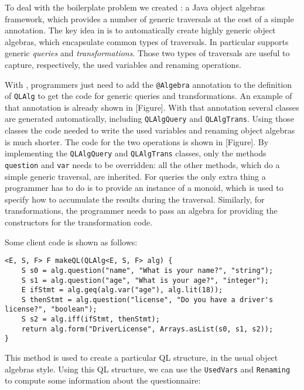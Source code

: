 To deal with the boilerplate problem we created \Name: a Java object
algebras framework, which provides a number of generic traversals at
the cost of a simple annotation. The key idea in \name is to
automatically create highly generic object algebras, which encapsulate
common types of traversals. In particular \name supports generic
\emph{queries} and \emph{transformations}. Those two types of
traversals are useful to capture, respectively, the used variables and
renaming operations.

With \Name, programmers just need to add the \lstinline{@Algebra} annotation
to the definition of \lstinline{QLAlg} to get the code for generic
queries and transformations. An example of that annotation is already
shown in [Figure]. With that annotation several classes
are generated automatically, including \lstinline{QLAlgQuery} and
\lstinline{QLAlgTrans}. Using those classes the code needed to write
the used variables and renaming object algebras is much
shorter. The code for the two operations is shown in
[Figure]. By implementing the
\lstinline{QLAlgQuery} and \lstinline{QLAlgTrans} classes, only the methods
\lstinline{question} and \lstinline{var} needs to be overridden: all the other methods,
which do a simple generic traversal, are inherited. For queries the
only extra thing a programmer has to do is to provide an instance of a
monoid, which is used to specify how to accumulate the results during
the traversal. Similarly, for transformations, the programmer needs to
pass an algebra for providing the constructors for the transformation
code.

Some client code is shown as follows: %

\begin{lstlisting}[numbers=none]
<E, S, F> F makeQL(QLAlg<E, S, F> alg) {
	S s0 = alg.question("name", "What is your name?", "string");
	S s1 = alg.question("age", "What is your age?", "integer");
	E ifStmt = alg.geq(alg.var("age"), alg.lit(18));
	S thenStmt = alg.question("license", "Do you have a driver's license?", "boolean");
	S s2 = alg.iff(ifStmt, thenStmt);
	return alg.form("DriverLicense", Arrays.asList(s0, s1, s2));		
}
\end{lstlisting}

This method is used to create a particular QL structure, in the
usual object algebras style.
Using this QL structure, we can use the \lstinline{UsedVars}
and \lstinline{Renaming} to compute some information about the questionnaire:

